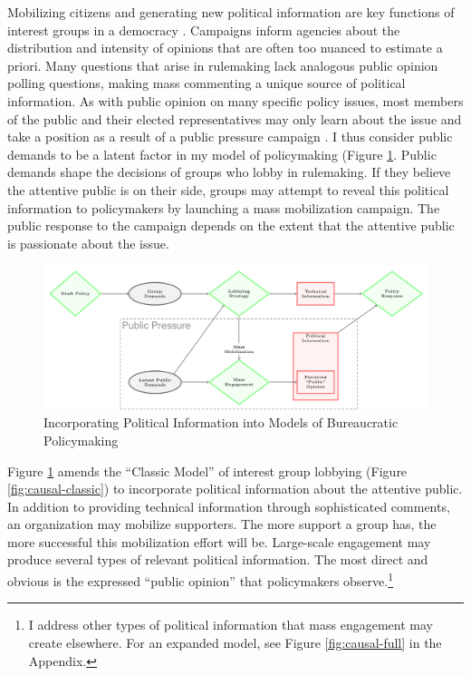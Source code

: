\documentclass[
      12pt,
        ]{article}
\begin{document}
Mobilizing citizens and generating new political information are key
functions of interest groups in a democracy
\citep{Mansbridge1992, Mahoney2007}. Campaigns inform agencies about the
distribution and intensity of opinions that are often too nuanced to
estimate a priori. Many questions that arise in rulemaking lack
analogous public opinion polling questions, making mass commenting a
unique source of political information. As with public opinion on many
specific policy issues, most members of the public and their elected
representatives may only learn about the issue and take a position as a
result of a public pressure campaign \citep{Hutchings2003}. I thus consider
public demands to be a latent factor in my model of policymaking (Figure
\ref{fig:causal-whymail}. Public demands shape the decisions of
groups who lobby in rulemaking. If they believe the attentive public is
on their side, groups may attempt to reveal this political information
to policymakers by launching a mass mobilization campaign. The public
response to the campaign depends on the extent that the attentive public
is passionate about the issue.

\begin{figure}

{\centering \includegraphics[width=6.5in]{../Figs/causal-whymail} 

}

\caption{Incorporating Political Information into Models of Bureaucratic Policymaking}\label{fig:causal-whymail}
\end{figure}

Figure \ref{fig:causal-whymail} amends the ``Classic Model'' of interest
group lobbying (Figure \ref{fig:causal-classic}) to incorporate political information about the attentive public. In addition to providing technical information through sophisticated comments, an organization may mobilize supporters.
The more support a group has, the more successful this mobilization effort will be.
Large-scale engagement may produce several types of relevant political
information. The most direct and obvious is the expressed ``public
opinion'' that policymakers observe.\footnote{I address other types of political information that mass engagement may create elsewhere. For an expanded model, see Figure
  \ref{fig:causal-full} in the Appendix.}
\end{document}
